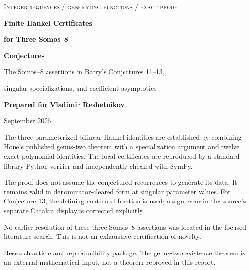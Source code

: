 \documentclass[11pt,letterpaper]{article}
\numberwithin{equation}{section}
\theoremstyle{definition}
\begin{document}
\begin{titlepage}
\color{Ink}
\noindent\textsc{Integer sequences \enspace / \enspace generating functions \enspace / \enspace exact proof}
\vspace{1.0in}
\begin{flushleft}
{\Huge\bfseries Finite Hankel Certificates\par}
\vspace{0.12in}
{\Huge\bfseries for Three Somos--8\par}
\vspace{0.12in}
{\Huge\bfseries Conjectures\par}
\vspace{0.35in}
{\Large The Somos--8 assertions in Barry's Conjectures 11--13,\par}
\vspace{0.07in}
{\Large singular specializations, and coefficient asymptotics\par}
\end{flushleft}
\vspace{0.45in}
\noindent\textbf{Prepared for Vladimir Reshetnikov}\par
{} September 2026
\vspace{0.35in}
\begin{resultbox}[title={\bfseries Result and proof status}]
The three parameterized bilinear Hankel identities are established by combining
Hone's published genus-two theorem with a specialization argument and twelve
exact polynomial identities. The local certificates are reproduced by a
standard-library Python verifier and independently checked with SymPy.

The proof does not assume the conjectured recurrences to generate its data.
It remains valid in denominator-cleared form at singular parameter values.
For Conjecture 13, the defining continued fraction is used; a sign error in the
source's separate Catalan display is corrected explicitly.

No earlier resolution of these three Somos--8 assertions was located in the
focused literature search. This is not an exhaustive certification of novelty.
\end{resultbox}
\vfill
\noindent\small Research article and reproducibility package. The genus-two existence theorem
is an external mathematical input, not a theorem reproved in this report.
\end{titlepage}
\end{document}
